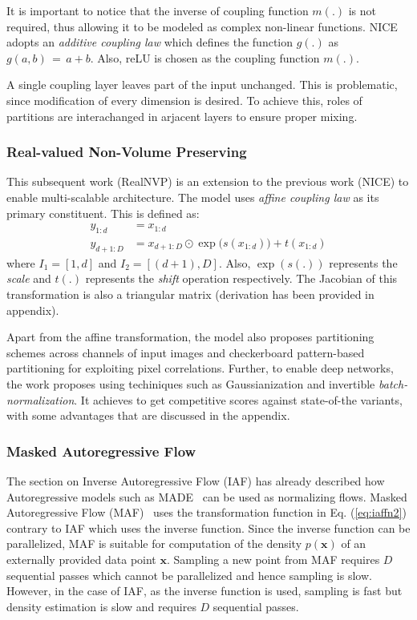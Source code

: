 \documentclass[runningheads]{llncs}
\begin{document}
It is important to notice that the inverse of coupling function $m(.)$ is not required, thus allowing it to be modeled as complex non-linear functions. NICE adopts an \textit{additive coupling law} which defines the function $g(.)$ as $g(a,b)\,=\,a+b$. Also, reLU is chosen as the coupling function $m(.)$.

A single coupling layer leaves part of the input unchanged. This is problematic, since modification of every dimension is desired. To achieve this, roles of partitions are interachanged in arjacent layers to ensure proper mixing. 
 
\subsubsection{Real-valued Non-Volume Preserving} \label{sec:realnvp}
This subsequent work (RealNVP) \cite{dinh2016density} is an extension to the previous work (NICE) to enable multi-scalable architecture. The model uses \textit{affine coupling law} as its primary constituent. This is defined as:
\begin{align}
y_{1:d} &= x_{1:d}\\
y_{d+1:D} &= x_{d+1:D} \odot \exp\big(s(x_{1:d})\big) + t(x_{1:d})
\end{align}
where $I_1 = [1,d]$ and $I_2 = [(d+1),D]$. Also, $\exp(s(.))$ represents the \textit{scale} and $t(.)$ represents the \textit{shift} operation respectively. The Jacobian of this transformation is also a triangular matrix (derivation has been provided in appendix).

Apart from the affine transformation, the model also proposes partitioning schemes across channels of input images and checkerboard pattern-based partitioning for exploiting pixel correlations. Further, to enable deep networks, the work proposes using techiniques such as Gaussianization and invertible \textit{batch-normalization}. It achieves to get competitive scores against state-of-the variants, with some advantages that are discussed in the appendix.

\subsubsection{Masked Autoregressive Flow} The section on Inverse Autoregressive Flow (IAF) has already described how Autoregressive models such as MADE~\cite{germain2015made} can be used as normalizing flows. Masked Autoregressive Flow (MAF)~\cite{papamakarios2017masked} uses the transformation function in Eq. (\ref{eq:iaffn2}) contrary to IAF which uses the inverse function. Since the inverse function can be parallelized, MAF is suitable for computation of the density $p(\mathbf{x})$ of an externally provided data point $\mathbf{x}$. Sampling a new point from MAF requires $D$ sequential passes which cannot be parallelized and hence sampling is slow. However, in the case of IAF, as the inverse function is used, sampling is fast but density estimation is slow and requires $D$ sequential passes.
\end{document}
